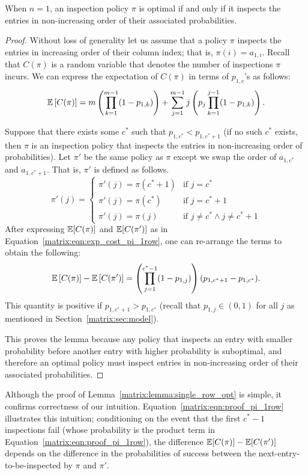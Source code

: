  \begin{lemma}\label{matrix:lemma:single_row_opt}
 When $n = 1$, an inspection policy $\pi$ is optimal if and only if it inspects the entries in non-increasing order of their associated probabilities.
 \end{lemma}
 \begin{proof}
 	Without loss of generality let us assume that a policy $\pi$ inspects the entries in increasing order of their column index; that is, $\pi(i) = a_{1,i}$. 
 	Recall that $C(\pi)$ is a random variable that denotes the number of inspections $\pi$ incurs. 
 	We can express the expectation of $C(\pi)$ in terms of $p_{1,c}$'s as follows:
 	\small
 	\begin{equation} \label{matrix:eqn:exp_cost_pi_1row}
 		\mathbb{E}\left[C(\pi)\right] = 
 		m \left(\prod_{k=1}^{m-1}(1 - p_{1,k})\right) + 
 		\sum_{j=1}^{m-1} j \left(p_j \prod_{k=1}^{j-1} (1-p_{1,k}) \right).
 	\end{equation}
 	\normalsize
	
 	Suppose that there exists some $c^*$ such that $p_{1,c^*} < p_{1,c^*+1}$ (if no such $c^*$ exists, then $\pi$ is an inspection policy that inspects the entries in non-increasing order of probabilities).
 	Let $\pi'$ be the same policy as $\pi$ except we swap the order of $a_{1,c^*}$ and $a_{1,c^*+1}$. 
 	That is, $\pi'$ is defined as follows.
 	\begin{equation*}
 		\pi'(j) = 
 		\begin{cases}
 			\pi'(j) = \pi(c^*+1)&  \mbox{if~} j = c^* \\
 			\pi'(j) = \pi(c^*)  &  \mbox{if~} j = c^*+1 \\
 			\pi'(j) = \pi(j)  &  \mbox{if~} j \neq c^* \land j \neq c^*+1
 		\end{cases}
 	\end{equation*}	
 	After expressing $\mathbb{E}[C(\pi)]$ and $\mathbb{E}[C(\pi')]$ as in Equation~\ref{matrix:eqn:exp_cost_pi_1row}, one can re-arrange the terms to obtain the following:
 	\begin{equation} \label{matrix:eqn:proof_pi_1row}
 	\mathbb{E}\left[C(\pi)\right] - \mathbb{E}\left[C(\pi')\right] = 
 	\left(\prod_{j=1}^{c^*-1} (1-p_{1,j})\right) (p_{1,c^*+1} - p_{1,c^*}).
 	\end{equation}
 	This quantity is positive if $p_{1,c^*+1} > p_{1,c^*}$ (recall that $p_{1,j} \in (0,1)$ for all $j$ as mentioned in Section~\ref{matrix:sec:model}). 
	
 	This proves the lemma because any policy that inspects an entry with smaller probability before another entry with higher probability is suboptimal, and therefore an optimal policy must inspect entries in non-increasing order of their associated probabilities. 
 \end{proof}
 Although the proof of Lemma~\ref{matrix:lemma:single_row_opt} is simple, it confirms correctness of our intuition. Equation~\ref{matrix:eqn:proof_pi_1row} illustrates this intuition; conditioning on the event that the first $c^*-1$ inspections fail (whose probability is the product term in Equation~\ref{matrix:eqn:proof_pi_1row}), the difference $\mathbb{E}[C(\pi)] - \mathbb{E}[C(\pi')]$ depends on the difference in the probabilities of success between the next-entry-to-be-inspected by $\pi$ and $\pi'$.

